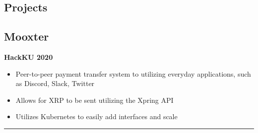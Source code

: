\documentclass[11pt, letterpaper]{article}
\newenvironment{desItemize}
{ \begin{itemize}[leftmargin=*, topsep=1pt]
    \setlength{\itemsep}{0pt}
    \setlength{\parskip}{0pt}
    \setlength{\parsep}{0pt}
    \small     }
{ \end{itemize}                  }
\newcommand{\columnRule}{
    \noindent\hspace{-0.5\columnsep}\rule{\columnwidth + \columnsep/2}{1pt}\noindent
}
\newenvironment{rightSection}[1]
{\section*{#1}}
{\columnRule}
\begin{document}
\begin{multicols*}{2}[]
\begin{rightSection}{Projects}
    \subsection*{Mooxter}
    \textbf{HackKU 2020}
    \begin{desItemize}
    \item Peer-to-peer payment transfer system to utilizing everyday applications, such as Discord, Slack, Twitter
    \item Allows for XRP to be sent utilizing the Xpring API
    \item Utilizes Kubernetes to easily add interfaces and scale
    \end{desItemize}
\end{rightSection}
\end{multicols*}
\end{document}
